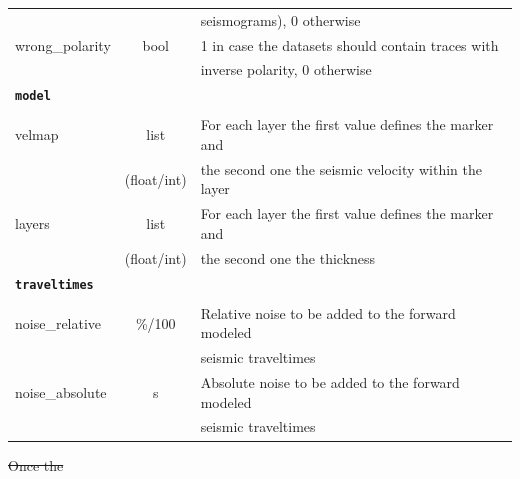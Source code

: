 \documentclass[a4paper,fleqn]{cas-sc}
\providecommand{\DIFdel}[1]{{\protect\color{red}\sout{#1}}}                      %
\providecommand{\DIFaddbegin}{} %
\providecommand{\DIFdelbegin}{} %
\providecommand{\DIFdelend}{} %
\newcommand{\DIFscaledelfig}{0.5}
\newlength{\DIFdelgraphicswidth} %
\newlength{\DIFdelgraphicsheight} %
\newcommand{\DIFaddincludegraphics}[2][]{{\color{blue}\fbox{\DIFOincludegraphics[#1]{#2}}}} %
\newcommand{\DIFdelincludegraphics}[2][]{%
\sbox{\DIFdelgraphicsbox}{\DIFOincludegraphics[#1]{#2}}%
\settoboxwidth{\DIFdelgraphicswidth}{\DIFdelgraphicsbox} %
\settoboxtotalheight{\DIFdelgraphicsheight}{\DIFdelgraphicsbox} %
\scalebox{\DIFscaledelfig}{%
\parbox[b]{\DIFdelgraphicswidth}{\usebox{\DIFdelgraphicsbox}\\[-\baselineskip] \rule{\DIFdelgraphicswidth}{0em}}\llap{\resizebox{\DIFdelgraphicswidth}{\DIFdelgraphicsheight}{%
\setlength{\unitlength}{\DIFdelgraphicswidth}%
\begin{picture}(1,1)%
\thicklines\linethickness{2pt} %
{\color[rgb]{1,0,0}\put(0,0){\framebox(1,1){}}}%
{\color[rgb]{1,0,0}\put(0,0){\line( 1,1){1}}}%
{\color[rgb]{1,0,0}\put(0,1){\line(1,-1){1}}}%
\end{picture}%
}\hspace*{3pt}}} %
} %
\DeclareRobustCommand{\DIFaddbegin}{\DIFOaddbegin \let\includegraphics\DIFaddincludegraphics} %
\DeclareRobustCommand{\DIFdelbegin}{\DIFOdelbegin \let\includegraphics\DIFdelincludegraphics} %
\DeclareRobustCommand{\DIFdelend}{\DIFOaddend \let\includegraphics\DIFOincludegraphics} %
\begin{document}
\begin{table}[]
\begin{tabular*}{\tblwidth}{@{} LCL@{}}
         & & seismograms), 0 otherwise \\
        wrong\_polarity & bool & 1 in case the datasets should contain traces with \\
         & & inverse polarity, 0 otherwise \\
        \midrule
        \textbf{\texttt{model}} & & \\
         & & \\
        velmap & list & For each layer the first value defines the marker and \\
         & (float/int) & the second one the seismic velocity within the layer \\
        layers & list & For each layer the first value defines the marker and \\
         & (float/int) & the second one the thickness \\
        \midrule
        \textbf{\texttt{traveltimes}} & & \\
         & & \\
        noise\_relative & \%/100 & Relative noise to be added to the forward modeled \\
      	 & & seismic traveltimes \\
        noise\_absolute & s & Absolute noise to be added to the forward modeled \\
         & & seismic traveltimes\\
        \bottomrule
    \end{tabular*}
    \label{tab:config}
\end{table}
\DIFdelbegin \DIFdel{Once the }\DIFdelend \DIFaddbegin 
\end{document}
